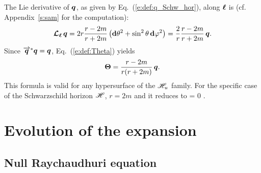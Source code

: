 \begin{example} \label{x:def:Schw_hor8}
The Lie derivative of $\bm{q}$, as given by Eq.~(\ref{e:def:q_Schw_hor}),
along $\bm{\ell}$ is (cf. Appendix~\ref{s:sam} for the computation):
\[
    \bm{\mathcal{L}}_{\bm{\bm{\ell}}}\, \bm{q} =  2 r \frac{r-2m}{r+2m} \left( \mathbf{d}\theta^2
        +  \sin^2\theta \, \mathbf{d}\varphi^2 \right) = \frac{2}{r} \frac{r-2m}{r+2m}
            \, \bm{q} .
\]
Since $\overrightarrow{\bm{q}}^* \bm{q} = \bm{q}$, Eq.~(\ref{e:def:Theta}) yields
\[
    \bm{\Theta} = \frac{r-2m}{r(r+2m)} \, \bm{q} .
\]
This formula is valid for any hypersurface of the $\mathscr{H}_u$ family. For the specific
case of the Schwarzschild horizon $\mathscr{H}$, $r=2m$ and it reduces to
\be \label{e:def:Theta_zero_Schw_hor}
    \w{\Theta} = 0 .
\ee
\end{example}


\section{Evolution of the expansion} \label{s:def:null_raychaud}

\subsection{Null Raychaudhuri equation}

